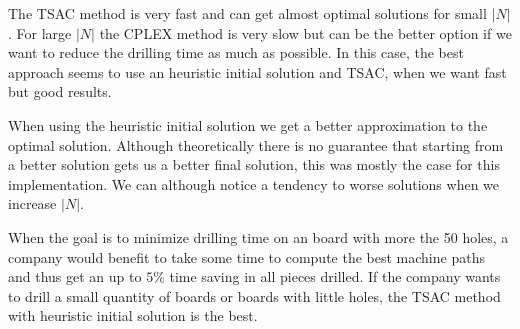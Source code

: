 \documentclass[a4paper,12pt]{article}
\begin{document}
		The TSAC method is very fast and can get almost optimal solutions for small $ |N| $.
		For large $ |N| $ the CPLEX method is very slow but can be the better option if we want to reduce the drilling time as much as possible.
		In this case, the best approach seems to use an heuristic initial solution and TSAC, when we want fast but good results.
		
		When using the heuristic initial solution we get a better approximation to the optimal solution.
		Although theoretically there is no guarantee that starting from a better solution gets us a better final solution, this was mostly the case for this implementation.
		We can although notice a tendency to worse solutions when we increase $ |N| $.
		
		When the goal is to minimize drilling time on an board with more the 50 holes, a company would benefit to take some time to compute the best machine paths and thus get an up to $5\%$ time saving in all pieces drilled.
		If the company wants to drill a small quantity of boards or boards with little holes, the TSAC method with heuristic initial solution is the best.
	
	
\end{document}
